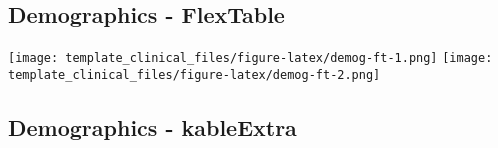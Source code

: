 \documentclass[]{article}
\begin{document}
\hypertarget{demographics---flextable}{%
\subsection{Demographics - FlexTable}\label{demographics---flextable}}

\texttt{[image: template\_clinical\_files/figure-latex/demog-ft-1.png]}
\texttt{[image: template\_clinical\_files/figure-latex/demog-ft-2.png]}

\hypertarget{demographics---kableextra}{%
\subsection{Demographics - kableExtra}\label{demographics---kableextra}}
\end{document}
